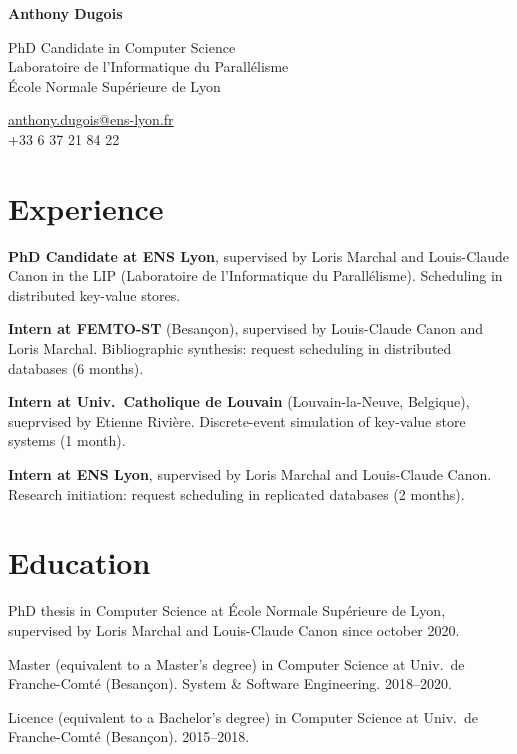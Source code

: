 \documentclass[12pt]{article}
\makeatletter
\newcommand{\myname}{Anthony Dugois}
\newcommand{\mymail}{anthony.dugois@ens-lyon.fr}
\newcommand{\myphone}{+33 6 37 21 84 22}
\newcommand{\myaffiliation}{PhD Candidate in Computer Science\\
  Laboratoire de l'Informatique du Parallélisme\\
  École Normale Supérieure de Lyon}
\newcommand{\mytitle}{%
  \raggedright

  {\normalfont\bfseries\huge\myname}
  
  \vspace{10pt}

  \begin{minipage}[t]{0.65\textwidth}
    \myaffiliation
  \end{minipage}%
  \begin{minipage}[t]{0.35\textwidth}
    \flushright
    \href{mailto:\mymail}{\mymail} \\
    \myphone
  \end{minipage}
}
\newcounter{cvitems}
\newcommand{\cvitem}[2]{\item[#1] #2}
\makeatother
\begin{document}
\mytitle

\section*{Experience}

\begin{cvitems}
  \cvitem{2020--}{\textbf{PhD Candidate at ENS Lyon}, supervised by Loris Marchal and Louis-Claude
  Canon in the LIP (Laboratoire de l'Informatique du Parallélisme).  
  Scheduling in distributed key-value stores.}

  \cvitem{2020}{\textbf{Intern at FEMTO-ST} (Besançon), supervised by Louis-Claude Canon and Loris
  Marchal.  
  Bibliographic synthesis: request scheduling in distributed databases (6 months).}

  \cvitem{2019}{\textbf{Intern at Univ.\ Catholique de Louvain}
  (Louvain-la-Neuve, Belgique), sueprvised by Etienne Rivière.  
  Discrete-event simulation of key-value store systems (1 month).}

  \cvitem{2019}{\textbf{Intern at ENS Lyon}, supervised by Loris Marchal and Louis-Claude Canon.  
  Research initiation: request scheduling in replicated databases (2 months).}


\end{cvitems}

\section*{Education}

\begin{cvitems}
  \cvitem{\bfseries PhD}{PhD thesis in Computer Science at École Normale Supérieure de Lyon,
  supervised by Loris Marchal and Louis-Claude Canon since october 2020.}

  \cvitem{\bfseries Master}{Master (equivalent to a Master's degree) in Computer Science at Univ.\
  de Franche-Comté (Besançon).  
  System \& Software Engineering.  
  2018--2020.}

  \cvitem{\bfseries Licence}{Licence (equivalent to a Bachelor's degree) in Computer Science at
  Univ.\ de Franche-Comté (Besançon).  
  2015--2018.}
\end{cvitems}
\end{document}
